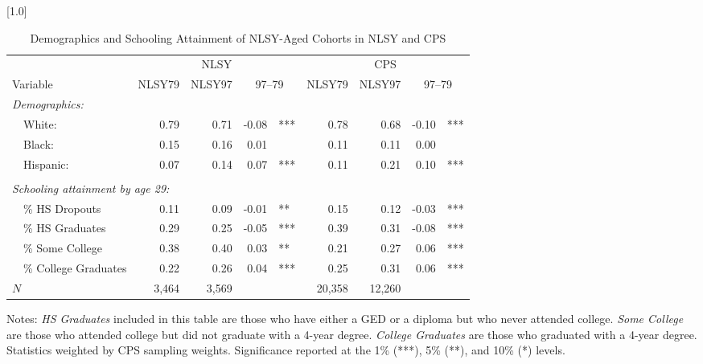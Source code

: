 \begin{table}[ht]
\caption{Demographics and Schooling Attainment of NLSY-Aged Cohorts in NLSY and CPS}
\label{tab:gradprobsCPS}
\centering
\scalebox{1.0}[1.0]{%
\begin{threeparttable}
\begin{tabular}{lrrr@{}lrrr@{}l}
\toprule 
         & \multicolumn{4}{c}{NLSY} & \multicolumn{4}{c}{CPS} \\
\cmidrule(r){2-5}\cmidrule(l){6-9} 
Variable & NLSY79 & NLSY97 & \multicolumn{2}{c}{97--79} & NLSY79 & NLSY97 & \multicolumn{2}{c}{97--79} \\
\midrule 
\multicolumn{9}{l}{\emph{Demographics:}} \\
~~White:            & 0.79 & 0.71 & -0.08 & ***  & 0.78  & 0.68  & -0.10  & *** \\ 
~~Black:            & 0.15 & 0.16 & 0.01  &      & 0.11       & 0.11       & 0.00       &   \\ 
~~Hispanic:         & 0.07 & 0.14 & 0.07  & ***  & 0.11    & 0.21    & 0.10    & *** \\ 
\vspace{-6pt} \\
\multicolumn{9}{l}{\emph{Schooling attainment by age 29:}} \\
~~\% HS Dropouts         & 0.11 & 0.09 & -0.01 &    **  & 0.15  & 0.12  & -0.03  & *** \\ 
~~\% HS Graduates        & 0.29 & 0.25 & -0.05 &   ***  & 0.39 & 0.31 & -0.08 & *** \\ 
~~\% Some College        & 0.38 & 0.40 & 0.03 &    **   & 0.21  & 0.27  & 0.06  & *** \\ 
~~\% College Graduates   & 0.22 & 0.26 & 0.04 &   ***   & 0.25 & 0.31 & 0.06 & *** \\ 
$N$                    & 3,464 &  3,569 &   &         & 20,358            & 12,260            &                                     & \\ 
\bottomrule 
\end{tabular} 
\footnotesize{Notes: \emph{HS Graduates} included in this table are those who have either a GED or a diploma but who never attended college. \emph{Some College} are those who attended college but did not graduate with a 4-year degree.     \emph{College Graduates} are those who graduated with a 4-year degree. Statistics weighted by CPS sampling weights. Significance reported at the 1\% (***), 5\% (**), and 10\% (*) levels.}
\end{threeparttable} 
} 
\end{table} 
